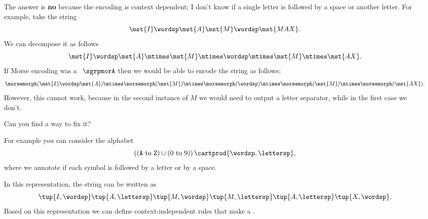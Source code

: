 %
\begin{solution}
    The answer is \textbf{no} because the encoding is context dependent; I don't know if a single letter is followed by a space or another letter.
    For example, take the string
    \begin{equation}
        \label{eq:max-iammax}
        \mst {I} \wordsp \mst{A} \mst{M}\wordsp \mst{MAX}.
    \end{equation}
    We can decompose it as follows
    \begin{equation}
        \label{eq:max-iammax-decomp}
        \mst{I}\wordsp \mst{A}\mtimes \mst{M} \mtimes \wordsp \mtimes \mst{M} \mtimes \mst{AX}.
    \end{equation}
    If Morse encoding was a \whomo~$\sgrpmorA$ then we would be able to encode the string as follows:
    \begin{equation}
        \label{eq:max-iammax-decomp-morph}
        \morsemorph(\mst{I}\wordsp \mst{A}) \mtimes \morsemorph (\mst{M}) \mtimes  \morsemorph(\wordsp) \mtimes  \morsemorph(\mst{M})
        \mtimes  \morsemorph(\mst{AX}).
    \end{equation}
    However, this cannot work, because in the second instance of $M$ we would need to output a letter separator, while in the first case we don't.
    
    Can you find a way to fix it?
    
    For example you can consider the alphabet
    \begin{equation}
        \left( (\texttt{A} \ \text{to}\ \texttt{Z}) \cup (0 \ \text{to}\ 9) \right) \cartprod \{\wordsp, \lettersp\},
    \end{equation}
    where we annotate if each symbol is followed by a letter or by a space.
    
    In this representation, the string can be written as
    \begin{equation}
        \tup{I, \wordsp} \tup{A, \lettersp} \tup{ M, \wordsp} \tup{M, \lettersp} \tup{A, \lettersp}
        \tup{X, \wordsp}.
    \end{equation}
    Based on this representation we can define context-independent rules that make a \whomo.
\end{solution}



